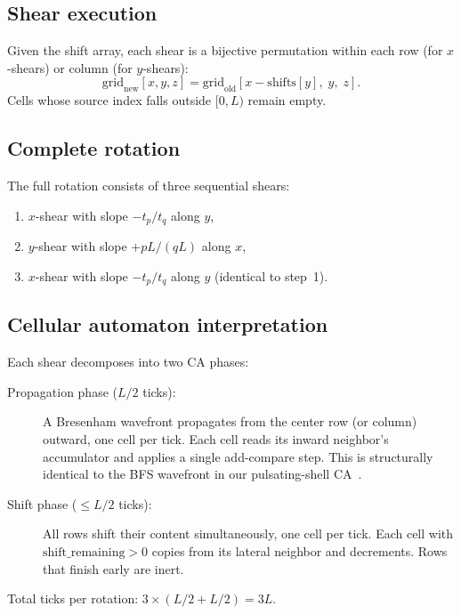 \documentclass[12pt,a4paper]{article}
\begin{document}
\subsection{Shear execution}

Given the shift array, each shear is a bijective permutation within
each row (for $x$-shears) or column (for $y$-shears):
\begin{equation}
\mathrm{grid}_{\mathrm{new}}[x, y, z]
= \mathrm{grid}_{\mathrm{old}}[x - \mathrm{shifts}[y],\; y,\; z].
\end{equation}
Cells whose source index falls outside $[0,L)$ remain empty.

\subsection{Complete rotation}

The full rotation consists of three sequential shears:
\begin{enumerate}
\item $x$-shear with slope $-t_p/t_q$ along $y$,
\item $y$-shear with slope $+pL/(qL)$ along $x$,
\item $x$-shear with slope $-t_p/t_q$ along $y$ (identical to step~1).
\end{enumerate}

\subsection{Cellular automaton interpretation}

Each shear decomposes into two CA phases:
\begin{description}
\item[Propagation phase ($L/2$ ticks):]
  A Bresenham wavefront propagates from the center row (or column)
  outward, one cell per tick.  Each cell reads its inward
  neighbor's accumulator and applies a single add-compare step.
  This is structurally identical to the BFS wavefront in our
  pulsating-shell CA~\cite{neto2026arithmetico}.
\item[Shift phase ($\le L/2$ ticks):]
  All rows shift their content simultaneously, one cell per tick.
  Each cell with $\mathrm{shift\_remaining} > 0$ copies from its
  lateral neighbor and decrements.  Rows that finish early are inert.
\end{description}
Total ticks per rotation: $3\times(L/2 + L/2) = 3L$.

\end{document}
